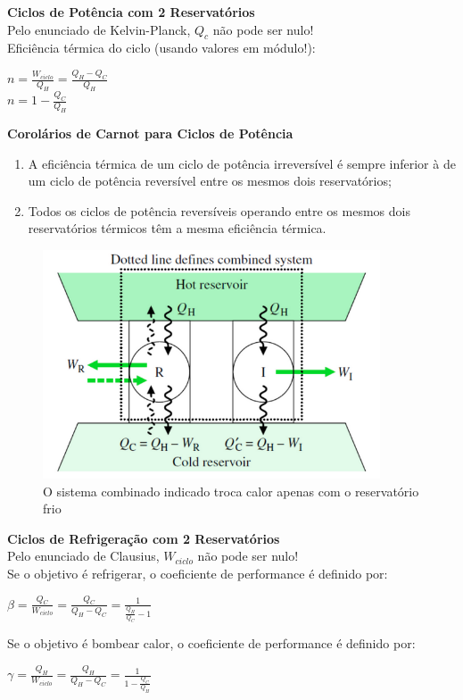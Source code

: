\documentclass[a4paper, 12pt]{article}
\begin{document}
\textbf{Ciclos de Potência com 2 Reservatórios}\\

Pelo enunciado de Kelvin-Planck, $ Q_c $ não pode ser nulo!\\

Eficiência térmica do ciclo
(usando valores em módulo!):
	\begin{center}
		\large
		$ n = \frac{W_{ciclo}}{Q_H} = \frac{Q_H - Q_C}{Q_H} $\\
		$ n = 1 - \frac{Q_C}{Q_H} $
	\end{center}

\textbf{Corolários de Carnot para Ciclos de Potência}
	\begin{enumerate}
		\item A eficiência térmica de um ciclo de potência irreversível é sempre inferior
		à de um ciclo de potência reversível entre os mesmos dois reservatórios;
		\item Todos os ciclos de potência reversíveis operando entre os mesmos dois
		reservatórios térmicos têm a mesma eficiência térmica.
	\end{enumerate}
	
	\begin{figure}[h]
		\includegraphics[width = 10cm]{rr.png}
		\centering
		\caption{O sistema combinado indicado troca
			calor apenas com o reservatório frio}
	\end{figure}
	
\newpage
\textbf{Ciclos de Refrigeração com 2 Reservatórios}\\
Pelo enunciado de Clausius, $ W_{ciclo} $ não pode ser nulo!\\

Se o objetivo é refrigerar, o coeficiente
de performance é definido por:
	\begin{center}
		\large
		$ \beta = \frac{Q_C}{W_{ciclo}} =  \frac{Q_C}{Q_H - Q_C} = \frac{1}{\frac{Q_H}{Q_C} - 1}$
	\end{center}
Se o objetivo é bombear calor, o coeficiente
de performance é definido por:
	\begin{center}
		\large
		$ \gamma = \frac{Q_H}{W_{ciclo}} = \frac{Q_H}{Q_H - Q_C} = \frac{1}{1 - \frac{Q_C}{Q_H}}$
	\end{center}
	
\end{document}
